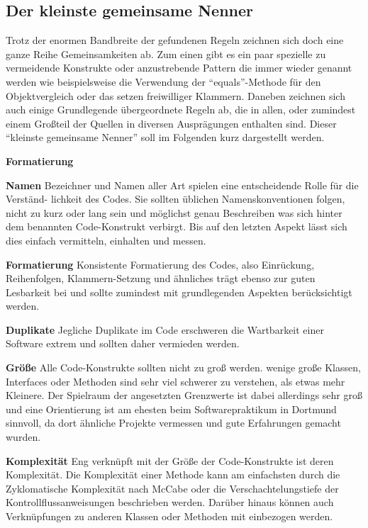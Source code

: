 \documentclass[da,ngerman]{stthesis}
\begin{document}
			\subsection{Der kleinste gemeinsame Nenner}
			Trotz der enormen Bandbreite der gefundenen Regeln zeichnen sich doch eine ganze Reihe Gemeinsamkeiten ab. Zum einen gibt es ein paar spezielle zu vermeidende Konstrukte oder anzustrebende Pattern die immer wieder genannt werden wie beispielsweise die Verwendung der "`equals"'-Methode für den Objektvergleich oder das setzen freiwilliger Klammern. Daneben zeichnen sich auch einige Grundlegende übergeordnete Regeln ab, die in allen, oder zumindest einem Großteil der Quellen in diversen Ausprägungen enthalten sind. Dieser "`kleinste gemeinsame Nenner"' soll im Folgenden kurz dargestellt werden. \newline
				\begin{labeling}{\textbf{Formatierung}}
					\item [\textbf{Namen}] Bezeichner und Namen aller Art spielen eine entscheidende Rolle für die Verständ- lichkeit des Codes. Sie sollten üblichen Namenskonventionen folgen, nicht zu kurz oder lang sein und möglichst genau Beschreiben was sich hinter dem benannten Code-Konstrukt verbirgt. Bis auf den letzten Aspekt lässt sich dies einfach vermitteln, einhalten und messen.
					\item [\textbf{Formatierung}] Konsistente Formatierung des Codes, also Einrückung, Reihenfolgen, Klammern-Setzung und ähnliches trägt ebenso zur guten Lesbarkeit bei und sollte zumindest mit grundlegenden Aspekten berücksichtigt werden.  
					\item [\textbf{Duplikate}] Jegliche Duplikate im Code erschweren die Wartbarkeit einer Software extrem und sollten daher vermieden werden. 
					\item [\textbf{Größe}] Alle Code-Konstrukte sollten nicht zu groß werden. wenige große Klassen, Interfaces oder Methoden sind sehr viel schwerer zu verstehen, als etwas mehr Kleinere. Der Spielraum der angesetzten Grenzwerte ist dabei allerdings sehr groß und eine Orientierung ist am ehesten beim Softwarepraktikum in Dortmund sinnvoll, da dort ähnliche Projekte vermessen und gute Erfahrungen gemacht wurden.
					\item [\textbf{Komplexität}] Eng verknüpft mit der Größe der Code-Konstrukte ist deren Komplexität. Die Komplexität einer Methode kann am einfachsten durch die Zyklomatische Komplexität nach McCabe \cite{AComplexityMeasure} oder die Verschachtelungstiefe der Kontrollflussanweisungen beschrieben werden. Darüber hinaus können auch Verknüpfungen zu anderen Klassen oder Methoden mit einbezogen werden.

\end{labeling}
\end{document}
